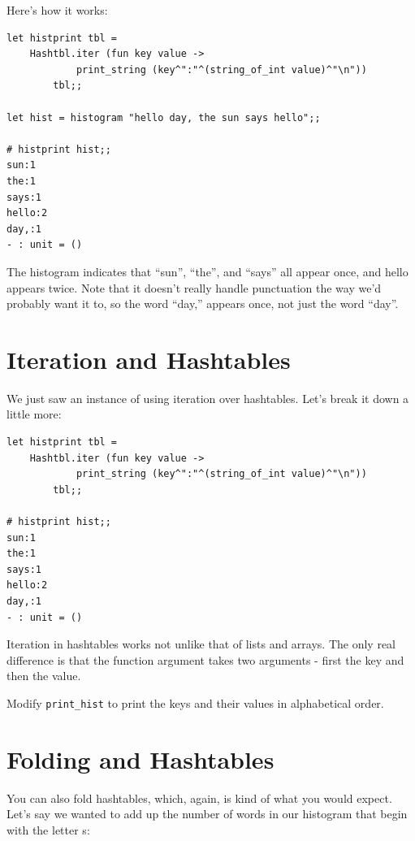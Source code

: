 \documentclass[10pt]{book}
\begin{document}
{

Here's how it works:

\beforeverb
\begin{verbatim}
let histprint tbl = 
	Hashtbl.iter (fun key value ->
			print_string (key^":"^(string_of_int value)^"\n"))
		tbl;;
		
let hist = histogram "hello day, the sun says hello";;

# histprint hist;;
sun:1
the:1
says:1
hello:2
day,:1
- : unit = ()
\end{verbatim}
\afterverb
%
The histogram indicates that ``sun'', ``the'', and ``says'' all appear once, and hello appears twice. Note that it doesn't really handle punctuation the way we'd probably want it to, so the word ``day,'' appears once, not just the word ``day''.

\section{Iteration and Hashtables}


We just saw an instance of using iteration over hashtables. Let's break it down a little more:

\beforeverb
\begin{verbatim}
let histprint tbl = 
	Hashtbl.iter (fun key value ->
			print_string (key^":"^(string_of_int value)^"\n"))
		tbl;;

# histprint hist;;
sun:1
the:1
says:1
hello:2
day,:1
- : unit = ()
\end{verbatim}
\afterverb

Iteration in hashtables works not unlike that of lists and arrays.
The only real difference is that the function argument takes two 
arguments - first the key and then the value.

\begin{ex}

Modify \verb"print_hist" to print the keys and their values
in alphabetical order.

\end{ex}

\section{Folding and Hashtables}

You can also fold hashtables, which, again, is kind of what you
would expect. Let's say we wanted to add up the number of words 
in our histogram that begin with the letter s:

}
\end{document}
